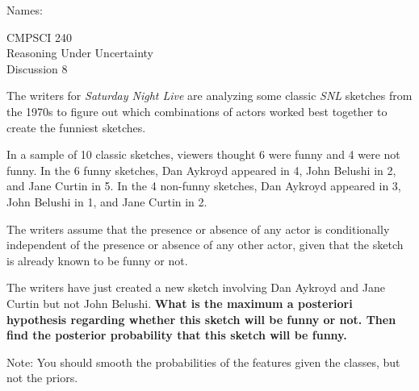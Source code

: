 \documentclass[letterpaper,11pt,english,oneside]{article}
\begin{document}
Names:

\begin{center}
\LARGE CMPSCI 240\\
Reasoning Under Uncertainty\\
Discussion 8\\
\end{center}

The writers for \textit{Saturday Night Live} are analyzing some
classic \textit{SNL} sketches from the 1970s to figure out which
combinations of actors worked best together to create the funniest
sketches.

In a sample of 10 classic sketches, viewers thought 6 were funny and 4
were not funny. In the 6 funny sketches, Dan Aykroyd appeared in 4,
John Belushi in 2, and Jane Curtin in 5.  In the 4 non-funny sketches,
Dan Aykroyd appeared in 3, John Belushi in 1, and Jane Curtin in 2.

The writers assume that the presence or absence of any actor is
conditionally independent of the presence or absence of any other
actor, given that the sketch is already known to be funny or not.

The writers have just created a new sketch involving Dan Aykroyd and
Jane Curtin but not John Belushi.  \textbf{What is the maximum a
  posteriori hypothesis regarding whether this sketch will be funny or
  not.  Then find the posterior probability that this sketch will be
  funny.}

Note: You should smooth the probabilities of the features given the
classes, but not the priors.
\end{document}
